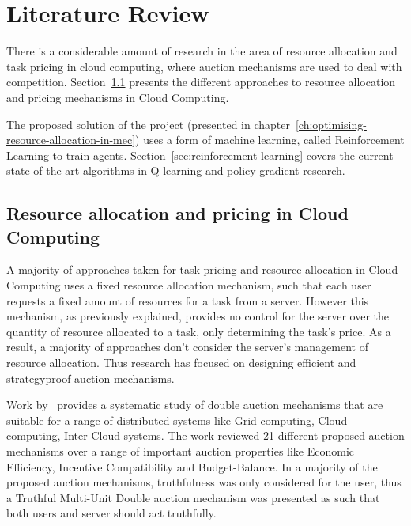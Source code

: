 \chapter{Literature Review}
\label{ch:literature-review}
There is a considerable amount of research in the area of resource allocation and task pricing in cloud computing,
where auction mechanisms are used to deal with competition.
Section~\ref{sec:resource-allocation-and-pricing-in-cloud-computing} presents the different approaches to resource
allocation and pricing mechanisms in Cloud Computing.

The proposed solution of the project (presented in chapter~\ref{ch:optimising-resource-allocation-in-mec}) uses a form of
machine learning, called Reinforcement Learning to train agents. Section~\ref{sec:reinforcement-learning} covers the current
state-of-the-art algorithms in Q learning and policy gradient research.

\section{Resource allocation and pricing in Cloud Computing}
\label{sec:resource-allocation-and-pricing-in-cloud-computing}
A majority of approaches taken for task pricing and resource allocation in Cloud Computing uses a fixed resource
allocation mechanism, such that each user requests a fixed amount of resources for a task from a server. However this
mechanism, as previously explained, provides no control for the server over the quantity of resource allocated to a task,
only determining the task's price. As a result, a majority of approaches don't consider the server's management of
resource allocation. Thus research has focused on designing efficient and strategyproof auction mechanisms.

Work by~\cite{KUMAR2017234} provides a systematic study of double auction mechanisms that are suitable for a range
of distributed systems like Grid computing, Cloud computing, Inter-Cloud systems. The work reviewed 21 different
proposed auction mechanisms over a range of important auction properties like Economic Efficiency,
Incentive Compatibility and Budget-Balance. In a majority of the proposed auction mechanisms, truthfulness was only
considered for the user, thus a Truthful Multi-Unit Double auction mechanism was presented as such that both users and
server should act truthfully.


